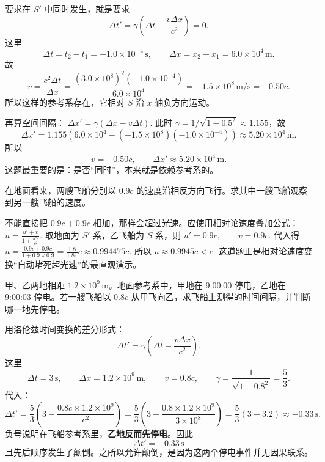 \documentclass[lang=cn,11pt]{elegantbook}
\begin{document}
\begin{solution}
要求在 \(S'\) 中同时发生，就是要求
\[
\Delta t'=\gamma\left(\Delta t-\frac{v\Delta x}{c^2}\right)=0.
\]
这里
\[
\Delta t=t_2-t_1=-1.0\times 10^{-4}\,\mathrm{s},
\qquad
\Delta x=x_2-x_1=6.0\times 10^4\,\mathrm{m}.
\]
故
\[
v=\frac{c^2\Delta t}{\Delta x}
=\frac{(3.0\times 10^8)^2(-1.0\times 10^{-4})}{6.0\times 10^4}
=-1.5\times 10^8\,\mathrm{m/s}
=-0.50c.
\]
所以这样的参考系存在，它相对 \(S\) 沿 \(x\) 轴负方向运动。

再算空间间隔：
 \(\Delta x'=\gamma(\Delta x-v\Delta t).\) 
此时 \(\gamma=1/\sqrt{1-0.5^2}\approx 1.155\)，故
\[
\Delta x'
=1.155\left(6.0\times 10^4-(-1.5\times 10^8)(-1.0\times 10^{-4})\right)
\approx 5.20\times 10^4\,\mathrm{m}.
\]
所以
\[
\boxed{v=-0.50c,\qquad \Delta x'\approx 5.20\times 10^4\,\mathrm{m}.}
\]
这题最重要的是：是否“同时”，本来就是依赖参考系的。
\end{solution}

\begin{exercise}[相向 \(0.9c\) 飞船的相对速度]
在地面看来，两艘飞船分别以 \(0.9c\) 的速度沿相反方向飞行。求其中一艘飞船观察到另一艘飞船的速度。
\end{exercise}

\begin{solution}
不能直接把 \(0.9c+0.9c\) 相加，那样会超过光速。应使用相对论速度叠加公式：
 \(u=\frac{u'+v}{1+\frac{u'v}{c^2}}.\) 
取地面为 \(S'\) 系，乙飞船为 \(S\) 系，则
 \(u' = 0.9c,\qquad v=0.9c.\) 
代入得
 \(u=\frac{0.9c+0.9c}{1+0.9\times 0.9} =\frac{1.8}{1.81}c \approx 0.994475c.\) 
所以
 \(\boxed{u\approx 0.9945c<c.}\) 
这道题正是相对论速度变换“自动堵死超光速”的最直观演示。
\end{solution}

\begin{exercise}[停电事件的先后顺序在飞船上怎样变化]
甲、乙两地相距 \(1.2\times 10^9\,\mathrm{m}\)。地面参考系中，甲地在 9:00:00 停电，乙地在 9:00:03 停电。若一艘飞船以 \(0.8c\) 从甲飞向乙，求飞船上测得的时间间隔，并判断哪一地先停电。
\end{exercise}

\begin{solution}
用洛伦兹时间变换的差分形式：
\[
\Delta t'=\gamma\left(\Delta t-\frac{v\Delta x}{c^2}\right).
\]
这里
\[
\Delta t=3\,\mathrm{s},
\qquad
\Delta x=1.2\times 10^9\,\mathrm{m},
\qquad
v=0.8c,
\qquad
\gamma=\frac{1}{\sqrt{1-0.8^2}}=\frac53.
\]
代入：
\[
\Delta t'
=\frac53\left(3-\frac{0.8c\times 1.2\times 10^9}{c^2}\right)
=\frac53\left(3-\frac{0.8\times 1.2\times 10^9}{3\times 10^8}\right)
=\frac53(3-3.2)
\approx -0.33\,\mathrm{s}.
\]
负号说明在飞船参考系里，\textbf{乙地反而先停电}。因此
\[
\boxed{\Delta t'=-0.33\,\mathrm{s}}
\]
且先后顺序发生了颠倒。之所以允许颠倒，是因为这两个停电事件并无因果联系。
\end{solution}
\end{document}
